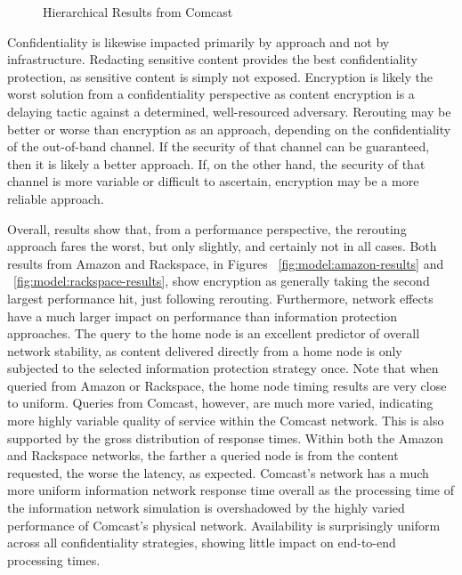 \begin{figure}[htbp]
\begin{minipage}[b]{0.5\linewidth}
\centering
{}
\end{minipage}
\begin{minipage}[b]{0.5\linewidth}
\centering
{}
\end{minipage}
\caption{Hierarchical Results from Comcast}
\label{fig:model:comcast-results}
\end{figure}

Confidentiality is likewise impacted primarily by approach and not by infrastructure.  Redacting sensitive content provides the best confidentiality protection, as sensitive content is simply not exposed.  Encryption is likely the worst solution from a confidentiality perspective as content encryption is a delaying tactic against a determined, well-resourced adversary.  Rerouting may be better or worse than encryption as an approach, depending on the confidentiality of the out-of-band channel.  If the security of that channel can be guaranteed, then it is likely a better approach.  If, on the other hand, the security of that channel is more variable or difficult to ascertain, encryption may be a more reliable approach.

Overall, results show that, from a performance perspective, the rerouting approach fares the worst, but only slightly, and certainly not in all cases.  Both results from Amazon and Rackspace, in Figures ~\ref{fig:model:amazon-results} and ~\ref{fig:model:rackspace-results}, show encryption as generally taking the second largest performance hit, just following rerouting.  Furthermore, network effects have a much larger impact on performance than information protection approaches.  The query to the home node is an excellent predictor of overall network stability, as content delivered directly from a home node is only subjected to the selected information protection strategy once.  Note that when queried from Amazon or Rackspace, the home node timing results are very close to uniform.  Queries from Comcast, however, are much more varied, indicating more highly variable quality of service within the Comcast network.  This is also supported by the gross distribution of response times.  Within both the Amazon and Rackspace networks, the farther a queried node is from the content requested, the worse the latency, as expected.  Comcast's network has a much more uniform information network response time overall as the processing time of the information network simulation is overshadowed by the highly varied performance of Comcast's physical network.  Availability is surprisingly uniform across all confidentiality strategies, showing little impact on end-to-end processing times.

